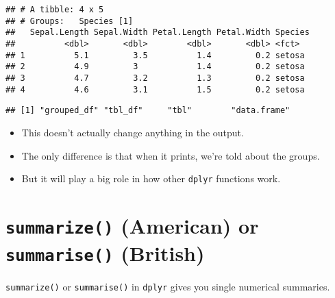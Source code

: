 \documentclass[]{article}
\newenvironment{Shaded}{\begin{snugshade}}{\end{snugshade}}
\newcommand{\CommentTok}[1]{\textcolor[rgb]{0.56,0.35,0.01}{\textit{#1}}}
\newcommand{\DataTypeTok}[1]{\textcolor[rgb]{0.13,0.29,0.53}{#1}}
\newcommand{\DecValTok}[1]{\textcolor[rgb]{0.00,0.00,0.81}{#1}}
\newcommand{\KeywordTok}[1]{\textcolor[rgb]{0.13,0.29,0.53}{\textbf{#1}}}
\newcommand{\NormalTok}[1]{#1}
\newcommand{\OperatorTok}[1]{\textcolor[rgb]{0.81,0.36,0.00}{\textbf{#1}}}
\newcommand{\StringTok}[1]{\textcolor[rgb]{0.31,0.60,0.02}{#1}}
\begin{document}
\begin{verbatim}
## # A tibble: 4 x 5
## # Groups:   Species [1]
##   Sepal.Length Sepal.Width Petal.Length Petal.Width Species
##          <dbl>       <dbl>        <dbl>       <dbl> <fct>  
## 1          5.1         3.5          1.4         0.2 setosa 
## 2          4.9         3            1.4         0.2 setosa 
## 3          4.7         3.2          1.3         0.2 setosa 
## 4          4.6         3.1          1.5         0.2 setosa
\end{verbatim}

\begin{Shaded}
\end{Shaded}

\begin{verbatim}
## [1] "grouped_df" "tbl_df"     "tbl"        "data.frame"
\end{verbatim}

\begin{itemize}
\item
  This doesn't actually change anything in the output.
\item
  The only difference is that when it prints, we're told about the
  groups.
\item
  But it will play a big role in how other \texttt{dplyr} functions
  work.
\end{itemize}

\hypertarget{summarize-american-or-summarise-british}{%
\section{\texorpdfstring{\texttt{summarize()} (American) or
\texttt{summarise()}
(British)}{summarize() (American) or summarise() (British)}}\label{summarize-american-or-summarise-british}}

\texttt{summarize()} or \texttt{summarise()} in \texttt{dplyr} gives you
single numerical summaries.

\begin{Shaded}
\end{Shaded}
\end{document}
